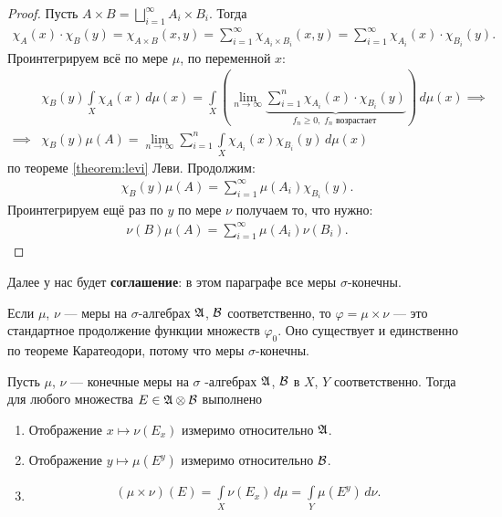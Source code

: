 \begin{proof}
 Пусть $A \times B = \bigsqcup_{i=1}^{\infty} A_i \times B_i$. Тогда \begin{align*}
  \chi_A(x) \cdot \chi_B(y) = \chi_{A \times B}(x, y) = \sum_{i=1}^{\infty} \chi_{A_i \times B_i}(x, y)  = \sum_{i=1}^{\infty} \chi_{A_i}(x) \cdot \chi_{B_i}(y)
 .\end{align*} Проинтегрируем всё по мере $\mu$, по переменной $x$:  \begin{align*}
 &\chi_B(y) \int\limits_{X} \chi_A(x) \, d\mu(x)   = \int\limits_{X} \left( \lim_{n \to \infty} \underbrace{\sum_{i=1}^{n} \chi_{A_i}(x) \cdot \chi_{B_i}(y)}_{f_n \geqslant 0,\; f_n \text{ возрастает }}  \right) \, d\mu(x) \implies \\
 \implies & \chi_B(y) \mu(A) = \lim_{n \to \infty} \sum_{i=1}^{n} \int\limits_{X} \chi_{A_i}(x) \chi_{B_i}(y) \, d\mu(x)
\end{align*} по теореме \ref{theorem:levi} Леви. Продолжим: \begin{align*}
\chi_B(y) \mu(A) = \sum_{i=1}^{\infty} \mu(A_i) \chi_{B_i}(y)
.\end{align*} Проинтегрируем ещё раз по $y$ по мере $\nu$ получаем то, что нужно: \begin{align*}
 \nu(B) \mu(A) = \sum_{i=1}^{\infty} \mu(A_i) \nu(B_i)
.\end{align*} 
\end{proof}

Далее у нас будет \textbf{соглашение}: в этом параграфе все меры $\sigma$-конечны.

\begin{df}
 Если $\mu$, $\nu$ --- меры на $\sigma$-алгебрах $\mathfrak{A}$, $\mathcal{B}$ соответственно, то $\varphi = \mu \times \nu$ --- это стандартное продолжение функции множеств $\varphi_0$. Оно существует и единственно по теореме Каратеодори, потому что меры $\sigma$-конечны.
\end{df}

\begin{thm}
\label{theorem:principle_cavalieri} 

Пусть $\mu$, $\nu$ --- конечные меры на  $\sigma$ -алгебрах $\mathfrak{A}$, $\mathcal{B}$  в $X$, $Y$ соответственно. Тогда для любого множества  $E \in \mathfrak{A} \otimes \mathcal{B}$  выполнено
\begin{enumerate}
 \item Отображение $x \mapsto \nu(E_x)$  измеримо относительно $\mathfrak{A}$.
 \item Отображение $y \mapsto \mu(E^{y})$  измеримо относительно $\mathcal{B}$.
 \item \begin{align*}
   (\mu \times \nu)(E) = \int\limits_{X} \nu(E_x) \, d\mu = \int\limits_{Y} \mu(E^{y}) \, d\nu
 .\end{align*} 
\end{enumerate}
\end{thm}

